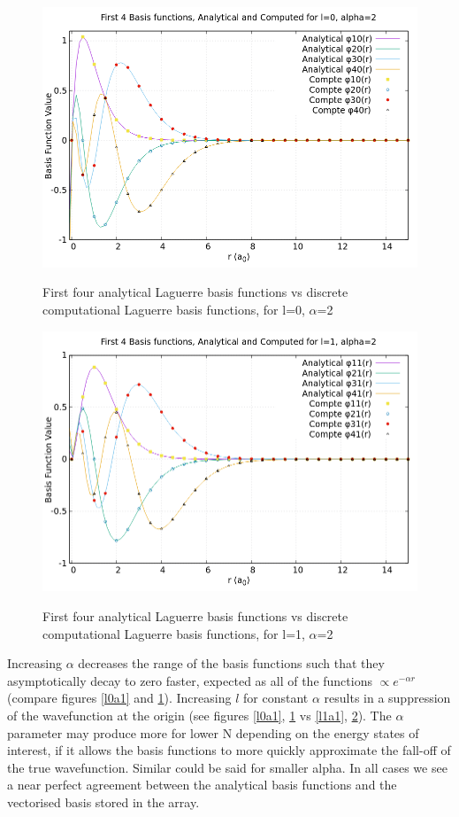 \documentclass{article}
\begin{document}
    \begin{figure}[H]
    	\centering
    	\includegraphics[scale=0.62]{Images/l0a2.png}\\
    	\caption{First four analytical Laguerre basis functions vs discrete computational Laguerre basis functions, for l=0, $\alpha$=2}
    	\label{l0a2}
    \end{figure}
    \begin{figure}[H]
    	\centering
    	\includegraphics[scale=0.62]{Images/l1a2.png}\\
    	\caption{First four analytical Laguerre basis functions vs discrete computational Laguerre basis functions, for l=1, $\alpha$=2}
    	\label{l1a2}
    \end{figure}
    
    Increasing $\alpha$ decreases the range of the basis functions such that they asymptotically decay to zero faster, expected as all of the functions $\propto e^{-\alpha r}$ (compare figures \ref{l0a1} and \ref{l0a2}). Increasing $l$ for constant $\alpha$ results in a suppression of the wavefunction at the origin (see figures \ref{l0a1}, \ref{l0a2} vs \ref{l1a1}, \ref{l1a2}). The $\alpha$ parameter may produce more for lower N depending on the energy states of interest, if it allows the basis functions to more quickly approximate the fall-off of the true wavefunction. Similar could be said for smaller alpha. In all cases we see a near perfect agreement  between the analytical basis functions and the vectorised basis stored in the array.
    
\end{document}
